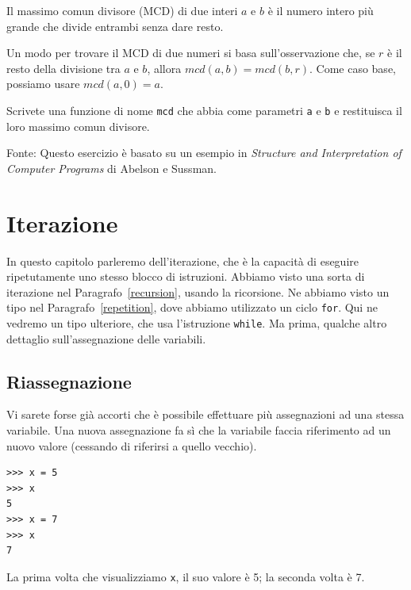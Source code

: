 \documentclass[10pt]{book}
\begin{document}
\vspace{0.2in}
\begin{exercise}

Il massimo comun divisore (MCD) di due interi $a$ e $b$ è il numero intero più grande che divide entrambi senza dare resto.  

Un modo per trovare il MCD di due numeri si basa sull'osservazione che, se $r$ è il resto della divisione tra $a$ e $b$, allora $mcd(a,
b) = mcd(b, r)$.  Come caso base, possiamo usare $mcd(a, 0) = a$.

Scrivete una funzione di nome
\verb"mcd" che abbia come parametri {\tt a} e {\tt b}
e restituisca il loro massimo comun divisore.

Fonte: Questo esercizio è basato su un esempio in {\em Structure and Interpretation of Computer Programs} di Abelson e Sussman.

\end{exercise}


\chapter{Iterazione}

In questo capitolo parleremo dell'iterazione, che è la capacità di eseguire ripetutamente uno stesso blocco di istruzioni. Abbiamo visto una sorta di iterazione nel Paragrafo~\ref{recursion}, usando la ricorsione. Ne abbiamo visto un tipo nel Paragrafo~\ref{repetition}, dove abbiamo utilizzato un ciclo {\tt for}. Qui ne vedremo un tipo ulteriore, che usa l'istruzione {\tt while}. Ma prima, qualche altro dettaglio sull'assegnazione delle variabili.


\section{Riassegnazione}

Vi sarete forse già accorti che è possibile effettuare più assegnazioni ad una stessa variabile. Una nuova assegnazione fa sì che la variabile faccia riferimento ad un nuovo valore (cessando di riferirsi a quello vecchio).

\begin{verbatim}
>>> x = 5
>>> x
5
>>> x = 7
>>> x
7
\end{verbatim}
%
La prima volta che visualizziamo {\tt x}, il suo valore è 5; la seconda volta è 7.
\end{document}
